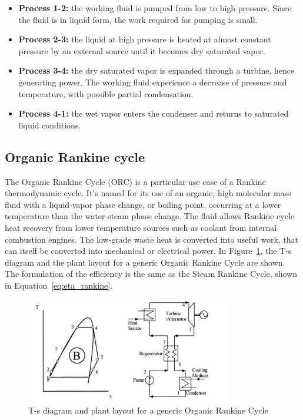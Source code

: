 \begin{itemize}
\item \textbf{Process 1-2:} the working fluid is pumped from low to high pressure. Since the fluid is in liquid form, the work required for pumping is small.
\item \textbf{Process 2-3:} the liquid at high pressure is heated at almost constant pressure by an external source until it becomes dry saturated vapor.
\item \textbf{Process 3-4:} the dry saturated vapor is expanded through a turbine, hence generating power. The working fluid experience a decrease of pressure and temperature, with possible partial condensation.
\item \textbf{Process 4-1:} the wet vapor enters the condenser and returns to saturated liquid conditions.
\end{itemize}



\subsection{Organic Rankine cycle}

The Organic Rankine Cycle (ORC) is a particular use case of a Rankine thermodynamic cycle. It's named for its use of an organic, high molecular mass fluid with a liquid-vapor phase change, or boiling point, occurring at a lower temperature than the water-steam phase change. The fluid allows Rankine cycle heat recovery from lower temperature sources such as coolant from internal combustion engines. The low-grade waste heat is converted into useful work, that can itself be converted into mechanical or electrical power. In Figure~\ref{fig:orc_diagram}, the T-s diagram and the plant layout for a generic Organic Rankine Cycle are shown. The formulation of the efficiency is the same as the Steam Rankine Cycle, shown in Equation~\ref{eq:eta_rankine}.

\begin{figure}[ht]
  \centering
  \includegraphics[width=0.8\textwidth]{figures/review/orc.jpg}
  \caption{T-s diagram and plant layout for a generic Organic Rankine Cycle\label{fig:orc_diagram} }
\end{figure}

